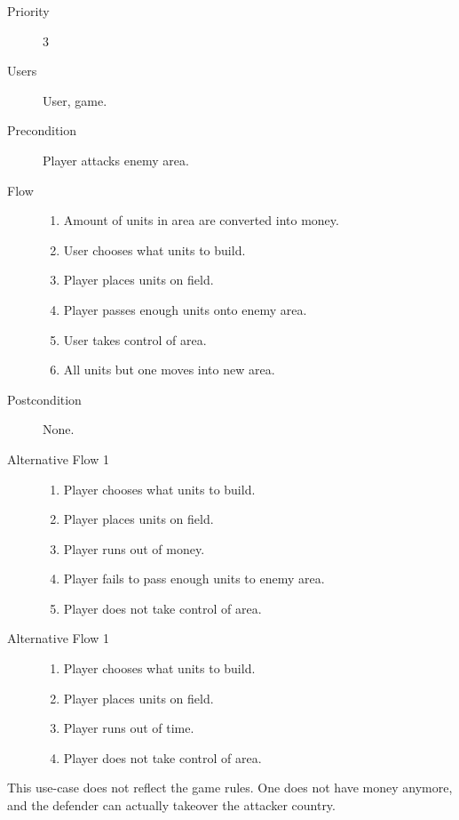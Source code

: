 \documentclass[12pt,a4paper]{article}
\begin{document}
\begin{description}
\item[Priority] 3
\item[Users]  User, game.
\item[Precondition] Player attacks enemy area.
\item[Flow]\mbox{}
  \begin{enumerate}
  \item Amount of units in area are converted into money.
  \item User chooses what units to build.
  \item Player places units on field.
  \item Player passes enough units onto enemy area.
  \item User takes control of area.
  \item All units but one moves into new area.
  \end{enumerate}
\item[Postcondition] None.
\item[Alternative Flow 1]\mbox{}
  \begin{enumerate}
  \item Player chooses what units to build.
  \item Player places units on field.
  \item Player runs out of money.
  \item Player fails to pass enough units to enemy area.
  \item Player does not take control of area.
  \end{enumerate}
\item[Alternative Flow 1]\mbox{}
  \begin{enumerate}
  \item Player chooses what units to build.
  \item Player places units on field.
  \item Player runs out of time.
  \item Player does not take control of area.
  \end{enumerate}
\end{description}

\begin{todo}
  This use-case does not reflect the game rules. One does not have money
  anymore, and the defender can actually takeover the attacker country.
\end{todo}
\end{document}
